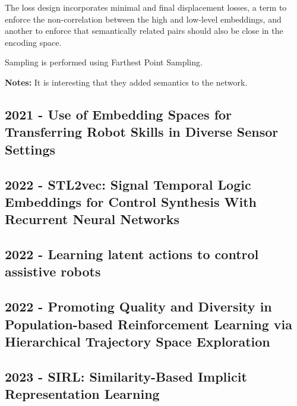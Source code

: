 The loss design incorporates minimal and final displacement losses, a term to enforce the non-correlation between the high and low-level embeddings, and another to enforce that semantically related pairs should also be close in the encoding space.

Sampling is performed using Farthest Point Sampling.

\textbf{Notes:} It is interesting that they added semantics to the network.
 

\subsection*{2021 - Use of Embedding Spaces for Transferring Robot Skills in Diverse Sensor Settings}
\cite{ninomiya2021use}

\subsection*{2022 - STL2vec: Signal Temporal Logic Embeddings for Control Synthesis With Recurrent Neural Networks}
\cite{hashimoto2022stl2vec}

\subsection*{2022 - Learning latent actions to control assistive robots}
\cite{losey2022learning}

\subsection*{2022 - Promoting Quality and Diversity in Population-based Reinforcement Learning via Hierarchical Trajectory Space Exploration}
\cite{miao2022promoting}

\subsection*{2023 - SIRL: Similarity-Based Implicit Representation Learning}
\cite{bobu2023sirl}
